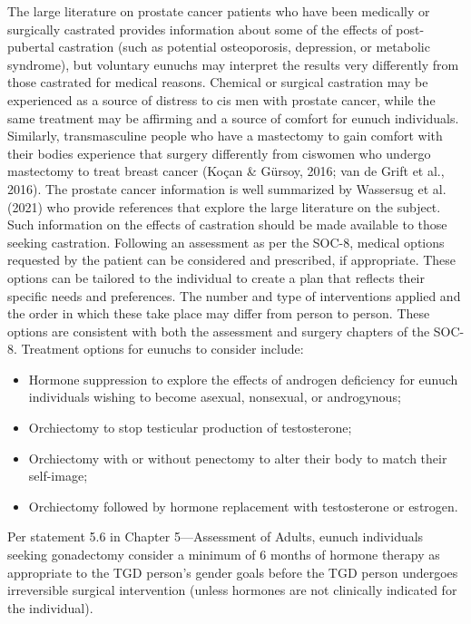 \documentclass[
]{book}
\providecommand{\tightlist}{%
  \setlength{\itemsep}{0pt}\setlength{\parskip}{0pt}}
\begin{document}
The large literature on prostate cancer patients
who have been medically or surgically castrated
provides information about some of the effects
of post-pubertal castration (such as potential
osteoporosis, depression, or metabolic syndrome),
but voluntary eunuchs may interpret the results
very differently from those castrated for medical
reasons. Chemical or surgical castration may be
experienced as a source of distress to cis men
with prostate cancer, while the same treatment
may be affirming and a source of comfort for
eunuch individuals. Similarly, transmasculine people who have a mastectomy to gain comfort with
their bodies experience that surgery differently
from ciswomen who undergo mastectomy to treat
breast cancer (Koçan \& Gürsoy, 2016; van de
Grift et al., 2016). The prostate cancer information is well summarized by Wassersug et al.
(2021) who provide references that explore the
large literature on the subject. Such information
on the effects of castration should be made available to those seeking castration.
Following an assessment as per the SOC-8,
medical options requested by the patient can be
considered and prescribed, if appropriate. These
options can be tailored to the individual to create
a plan that reflects their specific needs and preferences. The number and type of interventions
applied and the order in which these take place
may differ from person to person. These options
are consistent with both the assessment and surgery chapters of the SOC-8. Treatment options
for eunuchs to consider include:

\begin{itemize}
\tightlist
\item
  Hormone suppression to explore the effects of androgen deficiency for eunuch individuals wishing to become asexual, nonsexual, or androgynous;
\item
  Orchiectomy to stop testicular production of testosterone;
\item
  Orchiectomy with or without penectomy to alter their body to match their self-image;
\item
  Orchiectomy followed by hormone replacement with testosterone or estrogen.
\end{itemize}

Per statement 5.6 in Chapter 5---Assessment
of Adults, eunuch individuals seeking gonadectomy consider a minimum of 6 months of hormone therapy as appropriate to the TGD person's
gender goals before the TGD person undergoes
irreversible surgical intervention (unless hormones are not clinically indicated for the
individual).
\end{document}

